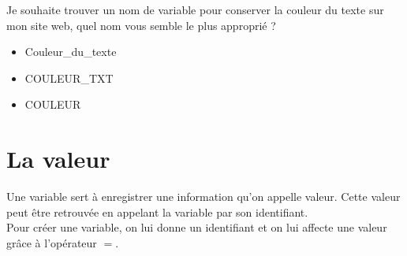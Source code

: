 \begin{Quizz}
    Je souhaite trouver un nom de variable pour conserver la couleur du texte sur mon site web, quel nom vous semble le plus approprié ?
    \begin{itemize}
    \renewcommand{\labelitemi}{$\square$}
    \item Couleur\_du\_texte
    \item COULEUR\_TXT
    \item COULEUR
    \end{itemize}
\end{Quizz}

\section*{La valeur}
Une variable sert à enregistrer une information qu'on appelle valeur. Cette valeur peut être retrouvée en appelant la variable par son identifiant.\\
Pour créer une variable, on lui donne un identifiant et on lui affecte une valeur grâce à l'opérateur $=$.

